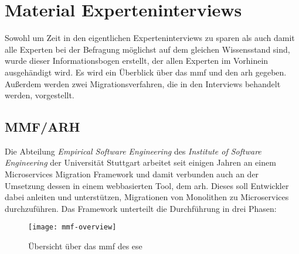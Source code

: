 \chapter{Material Experteninterviews}

Sowohl um Zeit in den eigentlichen Experteninterviews zu sparen als auch damit alle Experten bei der Befragung möglichst auf dem gleichen Wissensstand sind, wurde dieser Informationsbogen erstellt, der allen Experten im Vorhinein ausgehändigt wird.
Es wird ein Überblick über das \acrfull{mmf} und den \acrfull{arh} gegeben.
Außerdem werden zwei Migrationsverfahren, die in den Interviews behandelt werden, vorgestellt.

\section{MMF/ARH}

Die Abteilung \emph{Empirical Software Engineering} des \emph{Institute of Software Engineering} der Universität Stuttgart arbeitet seit einigen Jahren an einem Microservices Migration Framework und damit verbunden auch an der Umsetzung dessen in einem webbasierten Tool, dem \gls{arh}.
Dieses soll Entwickler dabei anleiten und unterstützen, Migrationen von Monolithen zu Microservices durchzuführen.
Das Framework unterteilt die Durchführung in drei Phasen:

\begin{figure}
	\centering
	\texttt{[image: mmf-overview]}
	\caption[\acrfull{mmf} Übersicht]{
		Übersicht über das \gls{mmf} des \gls{ese}
	}
	\label{fig:expert-material-mmf-overview}
\end{figure}

